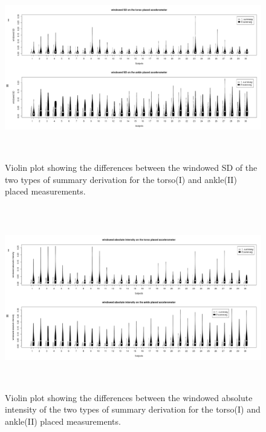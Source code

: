 \documentclass{article}
\begin{document}
{\begin{figure}[h]
\includegraphics[width=15cm, height=8cm]{final_violplot_SD.png}
\caption{Violin plot showing the differences between the windowed SD of the two types of summary derivation for the torso(I) and ankle(II) placed measurements.}
\end{figure}
\newpage
\begin{figure}[h!]
\includegraphics[width=15cm, height=8cm]{final_violplot_AI.png}
\caption{Violin plot showing the differences between the windowed absolute intensity of the two types of summary derivation for the torso(I) and ankle(II) placed measurements.}
\end{figure}

}
\end{document}

